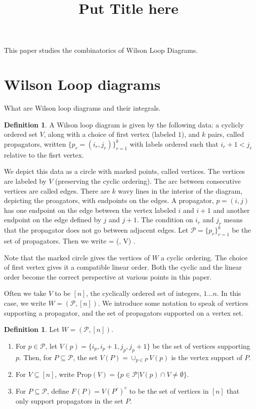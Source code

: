 \documentclass[11pt]{article}
\title{Put Title here}
\def\bas #1\eas{\begin{align*} #1 \end{align*}}
\newcommand{\cP}{\mathcal{P}}
\newcommand{\Prop}{\textrm{Prop}}
\theoremstyle{remark}
\theoremstyle{definition}
\newtheorem{dfn}[thm]{Definition}
\begin{document}
This paper studies the combinatorics of Wilson Loop Diagrams.
\section{Wilson Loop diagrams}\label{section background}

What are Wilson loop diagrams and their integrals.

\begin{dfn}\label{WLdfn}
A Wilson loop diagram is given by the following data: a cyclicly ordered set $V$, along with a choice of first vertex (labeled $1$), and $k$ pairs, called propagators, written $\{p_r = (i_r, j_r)\}_{r=1}^k$ with labels ordered such that $i_r +1 < j_r$ relative to the fisrt vertex. \end{dfn}

We depict this data as a circle with marked points, called vertices. The vertices are labeled by $V$ (preserving the cyclic ordering). The arc between consecutive vertices are called edges. There are $k$ wavy lines in the interior of the diagram, depicting the proagators, with endpoints on the edges. A propagator, $p =(i,j)$ has one endpoint on the edge between the vertex labeled $i$ and $i+1$ and another endpoint on the edge defined by $j$ and $j+1$. The condition on $i_r$ and $j_r$ means that the propagator does not go between adjacent edges. Let $\cP = \{p_r\}_{r=1}^k$ be the set of propagators. Then we write \bas W = (\cP, V) \;.\eas

Note that the marked circle gives the vertices of $W$ a cyclic ordering. The choice of first vertex gives it a compatible linear order. Both the cyclic and the linear order become the correct perspective at various points in this paper. 

Often we take $V$ to be $[n]$, the cyclically ordered set of integers, $1 \ldots n$. In this case, we write $W = (\cP, [n])$. We introduce some notation to speak of vertices supporting a propagator, and the set of propagators supported on a vertex set.

\begin{dfn} \label{VPropdfn}
Let $W = (\cP, [n])$.
\begin{enumerate}
\item For $p \in \cP$, let $V(p) = \{i_p, i_p+1, j_p, j_p+1\}$ be the set of vertices supporting $p$. Then, for $P \subseteq \cP$, the set $V(P) = \cup_{p \in P} V(p)$ is the vertex support of $P$.
\item For $V \subseteq [n]$, write $\Prop(V) = \{ p \in \cP | V(p) \cap V \neq \emptyset \} $.
\item For $P \subseteq \cP$, define $F(P) = V(P^c)^c$ to be the set of vertices in $[n]$ that only support propagators in the set $P$.
\end{enumerate}
\end{dfn}
\end{document}
